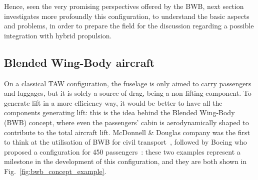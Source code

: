 Hence, seen the very promising perspectives offered by the BWB, next section investigates more profoundly this configuration, to understand the basic aspects and problems, in order to prepare the field for the discussion regarding a possible integration with hybrid propulsion. 

\subsection{Blended Wing-Body aircraft}
\label{subsec:chap1_bwb}

On a classical TAW configuration, the fuselage is only aimed to carry passengers and luggages, but it is solely a source of drag, being a non lifting component. 
To generate lift in a more efficiency way, it would be better to have all the components generating lift: this is the idea behind the Blended Wing-Body (BWB) concept, where even the passengers' cabin is aerodynamically shaped to contribute to the total aircraft lift. 
McDonnell \& Douglas company was the first to think at the utilisation of BWB for civil transport~\cite{bib:liebeck_1998}, followed by Boeing who proposed a configuration for 450 passengers~\cite{bib:liebeck_2004}: these two examples represent a milestone in the development of this configuration, and they are both shown in Fig.~\ref{fig:bwb_concept_example}. 
